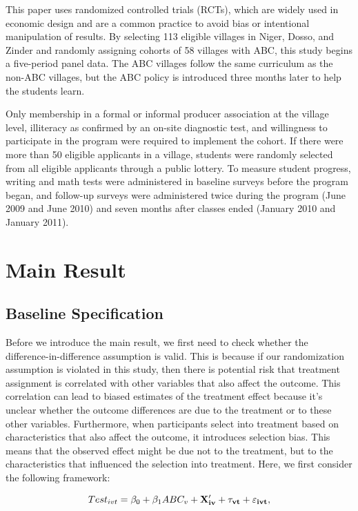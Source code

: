 \documentclass[12pt]{jfm}
\begin{document}
This paper uses randomized controlled trials (RCTs), which are widely used in economic design and are a common practice to avoid bias or intentional manipulation of results. By selecting 113 eligible villages in Niger, Dosso, and Zinder and randomly assigning cohorts of 58 villages with ABC, this study begins a five-period panel data. The ABC villages follow the same curriculum as the non-ABC villages, but the ABC policy is introduced three months later to help the students learn.

Only membership in a formal or informal producer association at the village level, illiteracy as confirmed by an on-site diagnostic test, and willingness to participate in the program were required to implement the cohort. If there were more than 50 eligible applicants in a village, students were randomly selected from all eligible applicants through a public lottery. To measure student progress, writing and math tests were administered in baseline surveys before the program began, and follow-up surveys were administered twice during the program (June 2009 and June 2010) and seven months after classes ended (January 2010 and January 2011).

\section{Main Result} \label{sec:mainresult}

\subsection{Baseline Specification} \label{subsec:baseline}

Before we introduce the main result, we first need to check whether the difference-in-difference assumption is valid. This is because if our randomization assumption is violated in this study, then there is potential risk that treatment assignment is correlated with other variables that also affect the outcome. This correlation can lead to biased estimates of the treatment effect because it's unclear whether the outcome differences are due to the treatment or to these other variables. Furthermore, when participants select into treatment based on characteristics that also affect the outcome, it introduces selection bias. This means that the observed effect might be due not to the treatment, but to the characteristics that influenced the selection into treatment. Here, we first consider the following framework:


\begin{equation}
  Test_{ivt} = \beta_0 + \beta_1 ABC_{v} + \bf{X}_{iv}^\prime + \tau_{vt} + \varepsilon_{ivt}, \label{eq:baseline}
\end{equation}
\end{document}
